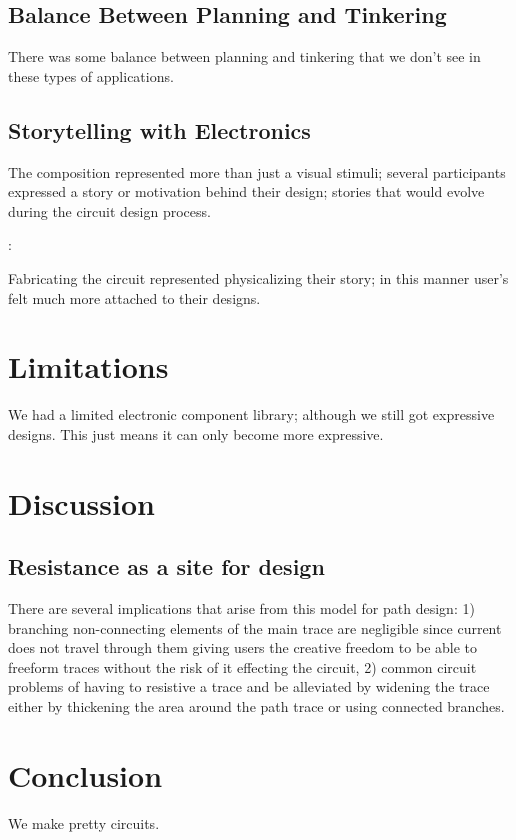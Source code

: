 \documentclass{sigchi}
\begin{document}
\subsection{Balance Between Planning and Tinkering}
  There was some balance between planning and tinkering that we don't see in these types of applications. 

\subsection{Storytelling with Electronics}
  The composition represented more than just a visual stimuli; several participants expressed a story or motivation behind their design; stories that would evolve during the circuit design process. 
  \begin{myquote}
   \vspace{-2pt}
    :
    \vspace{-2pt}
  \end{myquote} 
  Fabricating the circuit represented physicalizing their story; in this manner user's felt much more attached to their designs. 

\section{Limitations}
  We had a limited electronic component library; although we still got expressive designs. This just means it can only become more expressive. 


\section {Discussion}

  \subsection{Resistance as a site for design}
    There are several implications that arise from this model for path design: 1) branching non-connecting elements of the main trace are negligible since current does not travel through them giving users the creative freedom to be able to freeform traces without the risk of it effecting the circuit, 2) common circuit problems of having to resistive a trace and be alleviated by widening the trace either by thickening the area around the path trace or using connected branches. 
\section {Conclusion}
We make pretty circuits. 


\balance



\end{document}
